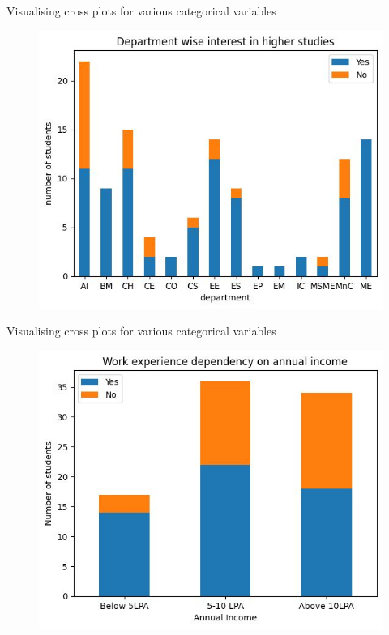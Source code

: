 \documentclass{beamer}
\begin{document}
\begin{frame}
  \begin{block}{Visualising cross plots for various categorical variables}
  \begin{figure}
  \centering
  \includegraphics[scale=0.6]{interest vs dept.jpg}
  \label{fig:9}
  \end{figure}
  \end{block}
\end{frame}

\begin{frame}
  \begin{block}{Visualising cross plots for various categorical variables}
  \begin{figure}
  \centering
  \includegraphics[scale=0.6]{income vs students.jpg}
  \label{fig:10}
  \end{figure}
  \end{block}
\end{frame}
\end{document}

